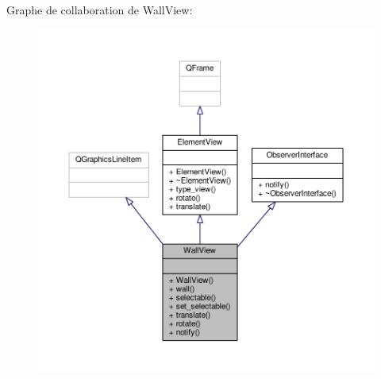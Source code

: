 Graphe de collaboration de Wall\+View\+:\nopagebreak
\begin{figure}[H]
\begin{center}
\leavevmode
\includegraphics[width=350pt]{d1/d8b/classWallView__coll__graph}
\end{center}
\end{figure}
